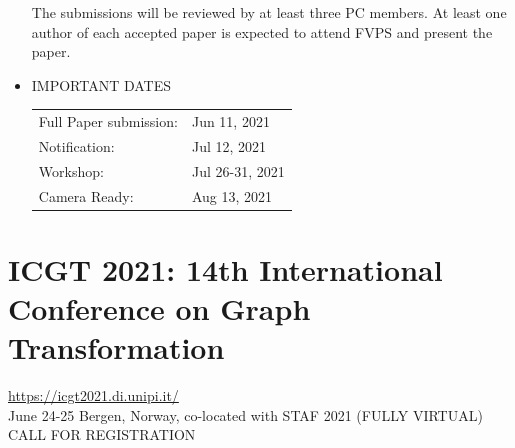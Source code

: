 \documentclass[prodmode,acmtecs]{acmsmall} %
\begin{document}
\begin{itemize}
  The submissions will be reviewed by at least three PC members. At least one author of each accepted paper is expected to attend FVPS and present the paper. 
 
\item  IMPORTANT DATES 
 
\begin{tabulary}{\linewidth}{LL}Full Paper submission:  & Jun 11, 2021 \\
Notification:  & Jul 12, 2021 \\
Workshop:  & Jul 26-31, 2021 \\
Camera Ready:  & Aug 13, 2021 \\
\end{tabulary}
 
\end{itemize}\section{ICGT 2021: 14th International Conference on Graph Transformation}\label{ICGT2021}  \href{https://icgt2021.di.unipi.it/}{https://icgt2021.di.unipi.it/}\\ 
  June 24-25 Bergen, Norway, co-located with STAF 2021 (FULLY VIRTUAL)\\ 
CALL FOR REGISTRATION 
\end{document}
